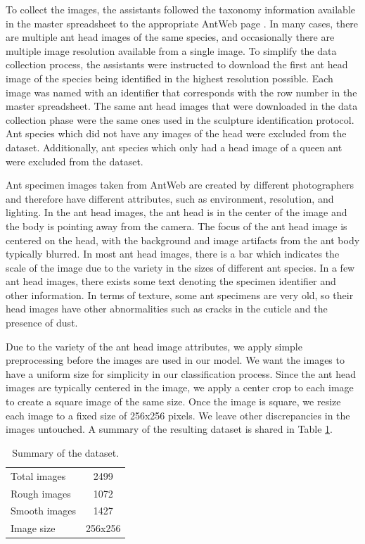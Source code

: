 \documentclass{aci}
\numberwithin{equation}{section}
\begin{document}
To collect the images, the assistants followed the taxonomy information
available in the master spreadsheet to the appropriate AntWeb page
\cite{perrichot_antweb_2012}. In many cases, there are multiple ant head images
of the same species, and occasionally there are multiple image resolution
available from a single image. To simplify the data collection process, the
assistants were instructed to download the first ant head image of the species
being identified in the highest resolution possible. Each image was named with
an identifier that corresponds with the row number in the master spreadsheet.
The same ant head images that were downloaded in the data collection phase were
the same ones used in the sculpture identification protocol. Ant species which
did not have any images of the head were excluded from the dataset.
Additionally, ant species which only had a head image of a queen ant were
excluded from the dataset.

Ant specimen images taken from AntWeb \cite{perrichot_antweb_2012} are created
by different photographers and therefore have different attributes, such as
environment, resolution, and lighting. In the ant head images, the ant head is
in the center of the image and the body is pointing away from the camera. The
focus of the ant head image is centered on the head, with the background and
image artifacts from the ant body typically blurred. In most ant head images,
there is a bar which indicates the scale of the image due to the variety in the
sizes of different ant species. In a few ant head images, there exists some text
denoting the specimen identifier and other information. In terms of texture,
some ant specimens are very old, so their head images have other abnormalities
such as cracks in the cuticle and the presence of dust.

Due to the variety of the ant head image attributes, we apply simple
preprocessing before the images are used in our model. We want the images to
have a uniform size for simplicity in our classification process. Since the ant
head images are typically centered in the image, we apply a center crop to each
image to create a square image of the same size. Once the image is square, we
resize each image to a fixed size of 256x256 pixels. We leave other
discrepancies in the images untouched. A summary of the resulting dataset is
shared in Table \ref{tab:dataset-summary}.

\begin{table}[h]
    \centering
    \caption{Summary of the dataset.}
    \begin{tabular}{lc}
        \toprule
        Total images  & 2499    \\
        Rough images  & 1072    \\
        Smooth images & 1427    \\
        Image size    & 256x256 \\
    \end{tabular}
    \label{tab:dataset-summary}
\end{table}
\end{document}
